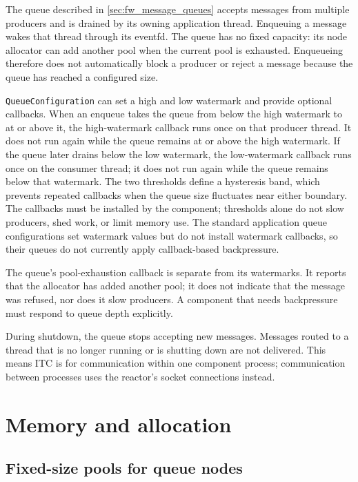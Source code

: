 The queue described in \cref{sec:fw_message_queues} accepts messages from
multiple producers and is drained by its owning application thread. Enqueuing
a message wakes that thread through its eventfd. The queue has no fixed
capacity: its node allocator can add another pool when the current pool is
exhausted. Enqueueing therefore does not automatically block a producer or
reject a message because the queue has reached a configured size.

\texttt{QueueConfiguration} can set a high and low watermark and provide
optional callbacks. When an enqueue takes the queue from below the high
watermark to at or above it, the high-watermark callback runs once on that
producer thread. It does not run again while the queue remains at or above the
high watermark. If the queue later drains below the low watermark, the
low-watermark callback runs once on the consumer thread; it does not run again
while the queue remains below that watermark. The two thresholds define a
hysteresis band, which prevents repeated callbacks when the queue size
fluctuates near either boundary. The callbacks must be installed by the
component; thresholds alone do not slow producers, shed work, or limit memory
use. The standard application queue configurations set watermark values but
do not install watermark callbacks, so their queues do not currently apply
callback-based backpressure.

The queue's pool-exhaustion callback is separate from its watermarks. It
reports that the allocator has added another pool; it does not indicate that
the message was refused, nor does it slow producers. A component that needs
backpressure must respond to queue depth explicitly.

During shutdown, the queue stops accepting new messages. Messages routed to a
thread that is no longer running or is shutting down are not delivered. This
means ITC is for communication within one component process; communication
between processes uses the reactor's socket connections instead.

\section{Memory and allocation}
\label{sec:fw_memory}

\subsection{Fixed-size pools for queue nodes}

